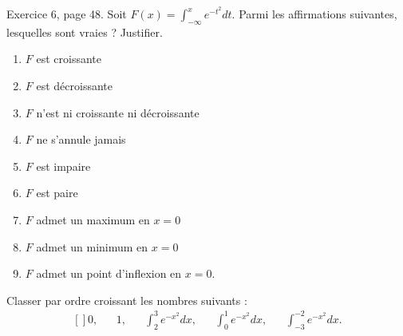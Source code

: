 \begin{exercice}\label{exoGeneral0021}

Exercice 6, page 48. Soit $F(x)=\int_{-\infty}^xe^{-t^2}dt$. Parmi les affirmations suivantes, lesquelles sont vraies ? Justifier.

\begin{multicols}{2}
\begin{enumerate}

\item
$F$ est croissante
\item
$F$ est décroissante

\item
$F$ n'est ni croissante ni décroissante

\item
$F$ ne s'annule jamais

\item
$F$ est impaire

\item
$F$ est paire

\item
$F$ admet un maximum en $x=0$

\item
$F$ admet un minimum en $x=0$

\item
$F$ admet un point d'inflexion en $x=0$.

\end{enumerate}
\end{multicols}

Classer par ordre croissant les nombres suivants :
\begin{equation}
	\begin{aligned}[]
		0,&&1,&&\int_2^3 e^{-x^2}dx,&&\int_0^1 e^{-x^2}dx,&&\int_{-3}^{-2} e^{-x^2}dx.
	\end{aligned}
\end{equation}

\end{exercice}
